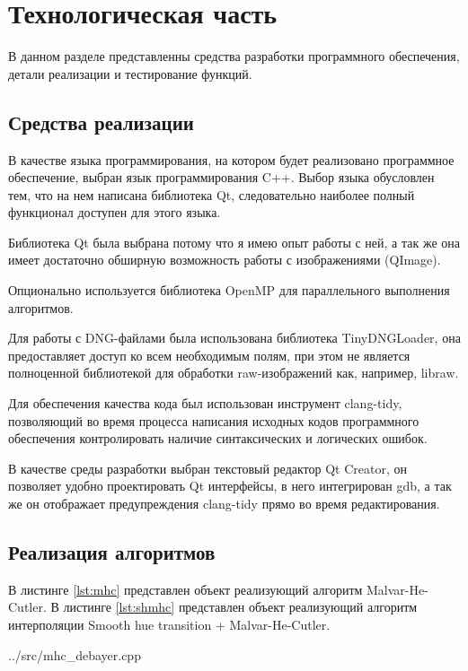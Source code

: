 \chapter{Технологическая часть}

В данном разделе представленны средства разработки программного обеспечения, детали реализации и тестирование функций.

\section{Средства реализации}

В качестве языка программирования, на котором будет реализовано программное обеспечение, выбран язык программирования C++. Выбор языка обусловлен тем, что на нем написана библиотека Qt, следовательно наиболее полный функционал доступен для этого языка. 

Библиотека Qt была выбрана потому что я имею опыт работы с ней, а так же она имеет достаточно обширную возможность работы с изображениями (QImage).

Опционально используется библиотека OpenMP для параллельного выполнения алгоритмов.

Для работы с DNG-файлами была использована библиотека TinyDNGLoader, она предоставляет доступ ко всем необходимым полям, при этом не является полноценной библиотекой для обработки raw-изображений как, например, libraw.

Для обеспечения качества кода был использован инструмент clang-tidy, позволяющий во время процесса написания исходных кодов программного обеспечения контролировать наличие синтаксических и логических ошибок.

В качестве среды разработки выбран текстовый редактор Qt Creator, он позволяет удобно проектировать Qt интерфейсы, в него интегрирован gdb, а так же он отображает предупреждения clang-tidy прямо во время редактирования.

\section{Реализация алгоритмов}

В листинге \ref{lst:mhc} представлен объект реализующий алгоритм Malvar-He-Cutler. В листинге \ref{lst:shmhc} представлен объект реализующий алгоритм интерполяции Smooth hue transition + Malvar-He-Cutler.

\begin{lstinputlisting}[
	caption={Malvar-He-Cutler.},
	label={lst:mhc},
	style={customc},
	]{../src/mhc_debayer.cpp}
\end{lstinputlisting}

